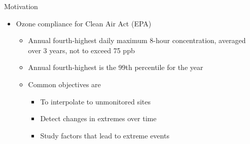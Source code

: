 \documentclass{beamer}
\begin{document}
\begin{frame}{Motivation}
  \begin{itemize} \setlength{\itemsep}{1em}
    \item Ozone compliance for Clean Air Act (EPA)
    \begin{itemize}
      \item Annual fourth-highest daily maximum 8-hour concentration, averaged over 3 years, not to exceed 75 ppb
      \item Annual fourth-highest is the 99th percentile for the year
      \item Common objectives are
      \begin{itemize}
        \item To interpolate to unmonitored sites
        \item Detect changes in extremes over time
        \item Study factors that lead to extreme events
      \end{itemize}
    \end{itemize}
  \end{itemize}
\end{frame}
\end{document}
